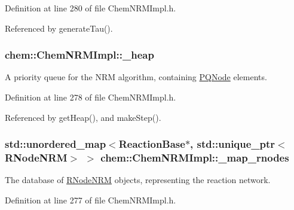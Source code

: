 Definition at line 280 of file Chem\-N\-R\-M\-Impl.\-h.



Referenced by generate\-Tau().

\hypertarget{classchem_1_1ChemNRMImpl_af2063c9b768c13ac541886947c567c1f}{
\subsubsection[{\-\_\-heap}]{ {\bf chem\-::\-Chem\-N\-R\-M\-Impl\-::\-\_\-heap}}}\label{classchem_1_1ChemNRMImpl_af2063c9b768c13ac541886947c567c1f}


A priority queue for the N\-R\-M algorithm, containing \hyperlink{classchem_1_1PQNode}{P\-Q\-Node} elements. 



Definition at line 278 of file Chem\-N\-R\-M\-Impl.\-h.



Referenced by get\-Heap(), and make\-Step().

\hypertarget{classchem_1_1ChemNRMImpl_a8eb526f8bc56b8aeeadca537004576db}{
\subsubsection[{\-\_\-map\-\_\-rnodes}]{\setlength{\rightskip}{0pt plus 5cm}std\-::unordered\-\_\-map$<${\bf Reaction\-Base}$\ast$, std\-::unique\-\_\-ptr$<${\bf R\-Node\-N\-R\-M}$>$ $>$ {\bf chem\-::\-Chem\-N\-R\-M\-Impl\-::\-\_\-map\-\_\-rnodes}}}\label{classchem_1_1ChemNRMImpl_a8eb526f8bc56b8aeeadca537004576db}


The database of \hyperlink{classchem_1_1RNodeNRM}{R\-Node\-N\-R\-M} objects, representing the reaction network. 



Definition at line 277 of file Chem\-N\-R\-M\-Impl.\-h.



